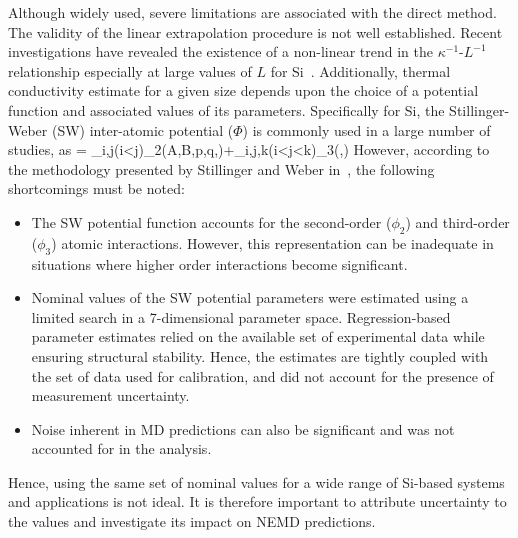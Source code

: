 Although widely used, severe limitations are associated with the direct method.
The validity of the linear extrapolation procedure is not well established. Recent
investigations have revealed the existence of a non-linear trend in the $\kappa^{-1}$-$L^{-1}$
relationship especially at large values of $L$ for Si~\cite{Sellan:2010}. Additionally, 
thermal conductivity estimate for a given size depends upon the choice of a potential
function and associated values of its parameters. Specifically for Si, the Stillinger-Weber (SW)
inter-atomic potential ($\Phi$) is commonly used in a large number of studies, as
%
\be
\Phi = \sum\limits_{i,j(i<j)}\phi_2(A,B,p,q,\alpha)\hspace{1mm}+\sum\limits_{i,j,k(i<j<k)}\phi_3(\lambda,\gamma)
\ee
%
However, according
to the methodology presented by Stillinger and Weber in~\cite{Stillinger:1985},
the following shortcomings must be noted:
%
\begin{itemize}
\item The SW potential function accounts for the second-order ($\phi_2$) and
third-order ($\phi_3$) atomic 
interactions. However, this representation can be inadequate in situations where 
higher order interactions become significant.  
\item Nominal values of the SW potential parameters were estimated using a 
limited search in a 7-dimensional parameter space. Regression-based parameter
estimates relied on the available set of experimental data while ensuring structural
stability. Hence, the estimates are tightly coupled with the set of data used for
calibration, and did not account for the presence of measurement uncertainty. 
\item Noise inherent in MD predictions can also be significant and
was not accounted for in the analysis. 
\end{itemize}
%
Hence, using the same set of nominal values for a wide range of Si-based systems and
applications is not ideal. It is therefore important to attribute uncertainty to the values and
investigate its impact on NEMD predictions. 


